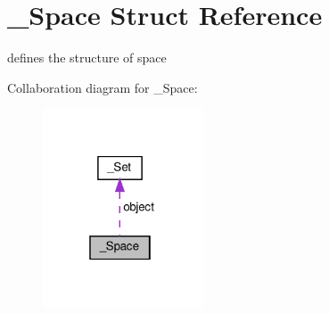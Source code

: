 \hypertarget{struct__Space}{}\section{\+\_\+\+Space Struct Reference}
\label{struct__Space}


defines the structure of space  




Collaboration diagram for \+\_\+\+Space\+:
\nopagebreak
\begin{figure}[H]
\begin{center}
\leavevmode
\includegraphics[width=135pt]{struct__Space__coll__graph}
\end{center}
\end{figure}
